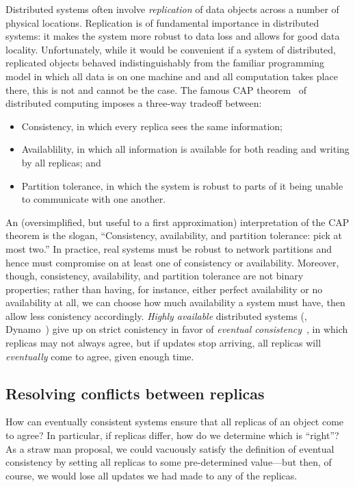 \documentclass{article}
\begin{document}
Distributed systems often involve \emph{replication} of data objects
across a number of physical locations.  Replication is of fundamental
importance in distributed systems: it makes the system more robust to
data loss and allows for good data locality.  Unfortunately, while it
would be convenient if a system of distributed, replicated objects
behaved indistinguishably from the familiar programming model in which
all data is on one machine and and all computation takes place there,
this is not and cannot be the case.  The famous CAP
theorem~\cite{gilbert-lynch-cap} of distributed computing imposes a
three-way tradeoff between:
\begin{itemize}
\item Consistency, in which every replica sees the same information;
\item Availablility, in which all information is available for both
  reading and writing by all replicas; and
\item Partition tolerance, in which the system is robust to parts of
  it being unable to communicate with one another.
\end{itemize}
An (oversimplified, but useful to a first approximation)
interpretation of the CAP theorem is the slogan, ``Consistency,
availability, and partition tolerance: pick at most two.''  In
practice, real systems must be robust to network partitions and hence
must compromise on at least one of consistency or availability.
Moreover, though, consistency, availability, and partition tolerance
are not binary properties; rather than having, for instance, either
perfect availability or no availability at all, we can choose how much
availability a system must have, then allow less conistency
accordingly.  \emph{Highly available} distributed systems (\eg,
Dynamo~\cite{dynamo}) give up on strict conistency in favor of
\emph{eventual consistency}~\cite{vogels-ec}, in which replicas may
not always agree, but if updates stop arriving, all replicas will
\emph{eventually} come to agree, given enough time.

\subsection{Resolving conflicts between replicas}

How can eventually consistent systems ensure that all replicas of an
object come to agree?  In particular, if replicas differ, how do we
determine which is ``right''?  As a straw man proposal, we could
vacuously satisfy the definition of eventual consistency by setting
all replicas to some pre-determined value---but then, of course, we
would lose all updates we had made to any of the replicas.
\end{document}
